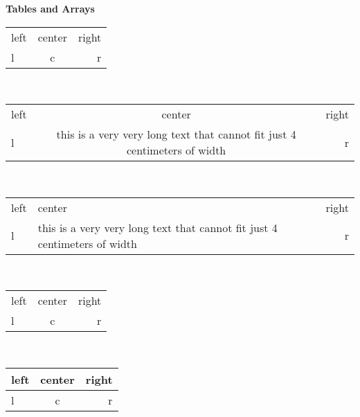 \documentclass[a4paper, 12pt]{book}
\begin{document}
\break

\begin{center}
  \Large\textbf{Tables and Arrays}
\end{center}


\begin{tabular}{lcr}
left & center & right \\
l & c & r
\end{tabular}
\\[\baselineskip]

\begin{tabular}{|l|c|r|}
  left & center & right \\
  l & this is a very very long text that cannot fit just 4 centimeters of width & r
\end{tabular}
\\[\baselineskip]


\begin{tabular}{|l|C{4cm}|r|}
  left & center & right \\
  l & this is a very very long text that cannot fit just 4 centimeters of width & r
\end{tabular}
\\[\baselineskip]

\begin{tabular}{|lc|r|}
  left & center & right \\
  l & c & r
\end{tabular}
\\[\baselineskip]



\begin{tabular}{|lc||r|}
  \hline
  left & center & right \\
  \hline
  l & c & r \\
  \hline
\end{tabular}
\\[\baselineskip]
\end{document}
